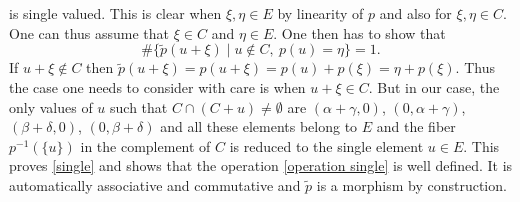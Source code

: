 \documentclass[12pt]{article}
\begin{document}
is single valued. This is clear when $\xi,\eta\in E$ by linearity of $p$ and also for $\xi,\eta \in C$. One can thus assume that $\xi \in C$ and $\eta\in E$.  One then has to show that 
\begin{equation}\label{single} 
	\#\{\tilde p(u+\xi)\mid u\notin C, \ p(u)=\eta\}=1.
\end{equation}
If $u+\xi\notin C$ then $\tilde p(u+\xi)=p(u+\xi)=p(u)+p(\xi)=\eta+p(\xi)$. Thus the case one needs to consider with care is when $u+\xi\in C$. But in our case, the only values of $u$ such that $C\cap (C+u)\neq \emptyset$ are $(\alpha +\gamma,0)$, $(0,\alpha+\gamma)$, $(\beta+\delta,0)$, $(0,\beta+\delta)$ and  all these elements belong to $E$ and the fiber $p^{-1}(\{u\})$ in the complement of $C$ is reduced to the single element $u\in E$. This proves \eqref{single} and shows that the operation \eqref{operation single} is well defined. It is automatically associative and commutative and $\tilde p$ is a morphism by construction. \endproof  
\end{document}
